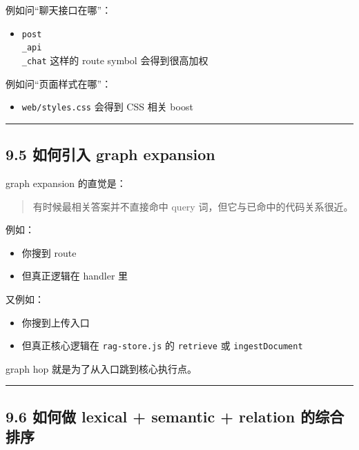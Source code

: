 \documentclass[UTF8,12pt,openany]{ctexbook}
\begin{document}
例如问“聊天接口在哪”：\par

\begin{itemize}
\item \texttt{post\\_api\\_chat} 这样的 route symbol 会得到很高加权
\end{itemize}

例如问“页面样式在哪”：\par

\begin{itemize}
\item \texttt{web/styles.css} 会得到 CSS 相关 boost
\end{itemize}

\hrule

\subsection{9.5 如何引入 graph expansion}

graph expansion 的直觉是：\par

\begin{quote}
有时候最相关答案并不直接命中 query 词，但它与已命中的代码关系很近。
\end{quote}

例如：\par

\begin{itemize}
\item 你搜到 route
\item 但真正逻辑在 handler 里
\end{itemize}

又例如：\par

\begin{itemize}
\item 你搜到上传入口
\item 但真正核心逻辑在 \texttt{rag-store.js} 的 \texttt{retrieve} 或 \texttt{ingestDocument}
\end{itemize}

graph hop 就是为了从入口跳到核心执行点。\par

\hrule

\subsection{9.6 如何做 lexical + semantic + relation 的综合排序}
\end{document}

